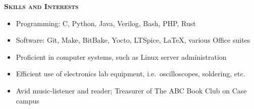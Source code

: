 \documentclass[12pt]{article}
\newcommand*{\titlefont}{\fontfamily{pnc}\selectfont}
\begin{document}
\vspace{-\topsep}

\bigbreak{}

%
%
%
%

\bigbreak{}

{\titlefont\large\textsc{\textbf{Skills and Interests}}}
\hrulefill{}\\
%
\vspace{-\topsep}
\begin{itemize}
    \setlength{\parskip}{0pt}
    \setlength{\itemsep}{0pt plus 1 pt}
    \item Programming: C, Python, Java, Verilog, Bash, PHP, Rust
    \item Software: Git, Make, BitBake, Yocto, LTSpice, LaTeX, various Office suites
    \item Proficient in computer systems, such as Linux server administration
    \item Efficient use of electronics lab equipment, i.e.\ oscilloscopes, soldering, etc.
    \item Avid music-listener and reader; Treasurer of The ABC Book Club on Case campus

\end{itemize}
\end{document}

